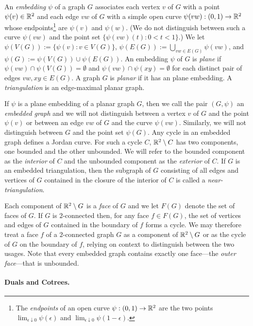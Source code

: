 \documentclass{patmorin}
\begin{document}
An \emph{embedding} $\psi$ of a graph $G$ associates each vertex $v$ of $G$ with a point $\psi(v)\in \mathbb{R}^2$ and each edge $vw$ of $G$ with a simple open curve $\psi(vw):(0,1)\to\mathbb{R}^2$ whose endpoints\footnote{The \emph{endpoints} of an open curve $\psi:(0,1)\to\mathbb{R}^2$ are the two points $\lim_{\epsilon\downarrow 0} \psi(\epsilon)$ and $\lim_{\epsilon\downarrow 0}\psi(1-\epsilon)$.} are $\psi(v)$ and $\psi(w)$.  (We do not distinguish between such a curve $\psi(vw)$ and the point set $\{\psi(vw)(t):0<t<1\}$.)
We let $\psi(V(G)):=\{\psi(v):v\in V(G)\}$, $\psi(E(G)):=\bigcup_{vw\in E(G)} \psi(vw)$, and $\psi(G):=\psi(V(G))\cup\psi(E(G))$.  An embedding $\psi$ of $G$ is \emph{plane} if $\psi(vw)\cap\psi(V(G))=\emptyset$ and $\psi(vw)\cap\psi(xy)=\emptyset$ for each distinct pair of edges $vw,xy\in E(G)$.  A graph $G$ is \emph{planar} if it has an plane embedding. A \emph{triangulation} is an edge-maximal planar graph.

If $\psi$ is a plane embedding of a planar graph $G$, then we call the pair $(G,\psi)$ an \emph{embedded graph} and we will not distinguish between a vertex $v$ of $G$ and the point $\psi(v)$ or between an edge $vw$ of $G$ and the curve $\psi(vw)$.  Similarly, we will not distinguish between $G$ and the  point set $\psi(G)$.  Any cycle in an embedded graph defines a Jordan curve. For such a cycle $C$, $\mathbb{R}^2\setminus C$ has two components, one bounded and the other unbounded. We will refer to the bounded component as the \emph{interior} of $C$ and the unbounded component as the \emph{exterior} of $C$.  If $G$ is an embedded triangulation, then the subgraph of $G$ consisting of all edges and vertices of $G$ contained in the closure of the interior of $C$ is called a \emph{near-triangulation}.

Each component of $\mathbb{R}^2\setminus G$ is a \emph{face} of $G$ and we let $F(G)$ denote the set of faces of $G$.  If $G$ is $2$-connected then, for any face $f\in F(G)$, the set of vertices and edges of $G$ contained in the boundary of $f$ forms a cycle.  We may therefore treat a face $f$ of a $2$-connected graph $G$ as a component of $\mathbb{R}^2\setminus G$ or as the cycle of $G$ on the boundary of $f$, relying on context to distinguish between the two usages.  Note that every embedded graph contains exactly one face---the \emph{outer face}---that is unbounded.

\paragraph{Duals and Cotrees.}
\end{document}
